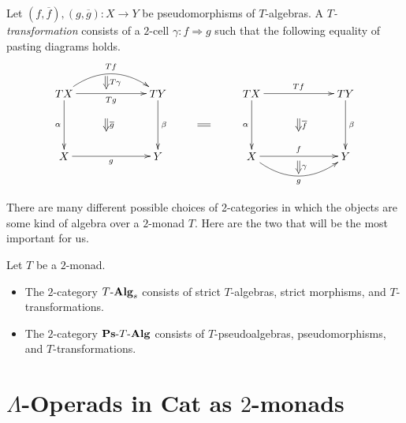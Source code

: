 \begin{Defi}\label{Defi:Ttrans}
Let $(f, \overline{f}), (g, \overline{g}) \colon X \rightarrow Y$ be pseudomorphisms of $T$-algebras. A \textit{$T$-transformation} consists of a $2$-cell $\gamma \colon f \Rightarrow g$ such that the following equality of pasting diagrams holds.
    \[
        \xy
            (0,0)*+{TX}="00";
            (30,0)*+{TY}="10";
            (0,-20)*+{X}="01";
            (30,-20)*+{Y}="11";
            {\ar@/^1.5pc/^{Tf} "00" ; "10"};
            {\ar_{Tg} "00" ; "10"};
            {\ar^{\beta} "10" ; "11"};
            {\ar_{\alpha} "00" ; "01"};
            {\ar_{g} "01" ; "11"};
            {\ar@{=>}^{T \gamma} (13.5,5.5) ; (13.5,1.5)};
            {\ar@{=>}^{\overline{g}} (13.5,-8) ; (13.5,-12)};
            (60,0)*+{TX}="x00";
            (90,0)*+{TY}="x10";
            (60,-20)*+{X}="x01";
            (90,-20)*+{Y}="x11";
            {\ar^{Tf} "x00" ; "x10"};
            {\ar^{\beta} "x10" ; "x11"};
            {\ar_{\alpha} "x00" ; "x01"};
            {\ar^{f} "x01" ; "x11"};
            {\ar@/_1.5pc/_{g} "x01" ; "x11"};
            {\ar@{=>}^{\gamma} (75,-21.5) ; (75,-25.5)};
            {\ar@{=>}^{\overline{f}} (75,-8) ; (75,-12)};
            {\ar@{=} (42.75,-10) ; (46.75,-10)};
        \endxy
    \]

\end{Defi}

There are many different possible choices of 2-categories in which the objects are some kind of algebra over a $2$-monad $T$.
Here are the two that will be the most important for us.

\begin{Defi}\label{Defi:2cat-of-algs}
Let $T$ be a $2$-monad.
\begin{itemize}
\item The $2$-category $T\mbox{-}\mathbf{Alg}_{s}$ consists of strict $T$-algebras, strict morphisms, and $T$-transformations.
\item The $2$-category $\mathbf{Ps}\mbox{-}T\mbox{-}\mathbf{Alg}$ consists of $T$-pseudoalgebras, pseudomorphisms, and $T$-transformations.
\end{itemize}
\end{Defi}

\section{\texorpdfstring{$\Lambda$}{L}-Operads in Cat as $2$-monads}

